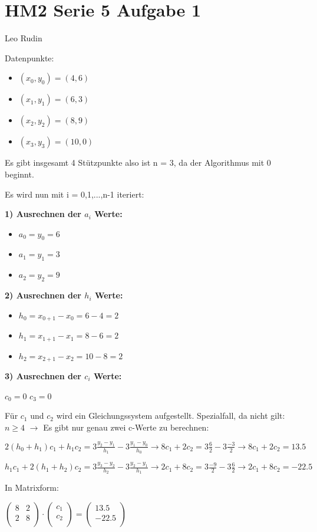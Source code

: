 \documentclass{article}
\begin{document}
\section*{HM2 Serie 5 Aufgabe 1}
Leo Rudin

Datenpunkte:
\begin{itemize}
    \item \((x_0,y_0) = (4,6)\)
    \item \((x_1,y_1) = (6,3)\)
    \item \((x_2,y_2) = (8,9)\)
    \item \((x_3,y_3) = (10,0)\)
\end{itemize}

Es gibt insgesamt 4 Stützpunkte also ist n = 3, da der Algorithmus mit 0 beginnt.

Es wird nun mit i = 0,1,...,n-1 iteriert:

\textbf{1) Ausrechnen der \(a_i\) Werte:}
\begin{itemize}
    \item \(a_0 = y_0 = 6\)
    \item \(a_1 = y_1 = 3\)
    \item \(a_2 = y_2 = 9\)
\end{itemize}

\textbf{2) Ausrechnen der \(h_i\) Werte:}
\begin{itemize}
    \item \(h_0 = x_{0+1} - x_0 = 6 - 4 = 2\)
    \item \(h_1 = x_{1+1} - x_1 = 8 - 6 = 2\)
    \item \(h_2 = x_{2+1} - x_2 = 10 - 8 = 2\)
\end{itemize}

\textbf{3) Ausrechnen der \(c_i\) Werte:}

\(c_0 = 0\) \(c_3 = 0\)

Für \(c_1\) und \(c_2\) wird ein Gleichungssystem aufgestellt. Spezialfall, da nicht gilt: \(n \geq 4\) \(\rightarrow\) Es gibt nur genau zwei c-Werte zu berechnen:

\(2(h_0 + h_1)c_1 + h_1c_2 = 3\frac{y_2-y_1}{h_1} - 3\frac{y_1-y_0}{h_0} \rightarrow 8c_1 + 2c_2 = 3\frac{6}{2} - 3\frac{-3}{2} \rightarrow 8c_1 + 2c_2 = 13.5\)

\(h_1c_1 + 2(h_1 + h_2)c_2 = 3\frac{y_3-y_2}{h_2} - 3\frac{y_2-y_1}{h_1} \rightarrow 2c_1 + 8c_2 = 3\frac{-9}{2} - 3\frac{6}{2} \rightarrow 2c_1 + 8c_2 =  -22.5\)

In Matrixform:

\(
\begin{pmatrix}
8 & 2\\
2 & 8\\
\end{pmatrix}
\cdot
\begin{pmatrix}
c_1\\
c_2\\
\end{pmatrix}
=
\begin{pmatrix}
13.5\\
-22.5\\
\end{pmatrix}
\)
\end{document}
